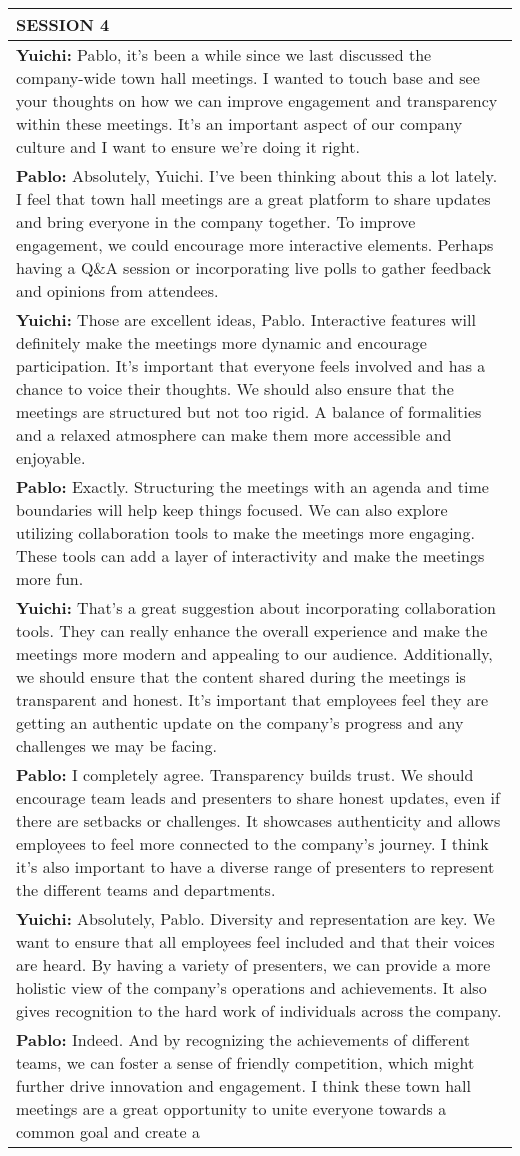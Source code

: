 \begin{xltabular}{0.9\linewidth}{X}
\midrule
\textbf{SESSION 4} \\
\midrule
\textbf{Yuichi:} Pablo, it's been a while since we last discussed the company-wide town hall meetings. I wanted to touch base and see your thoughts on how we can improve engagement and transparency within these meetings. It's an important aspect of our company culture and I want to ensure we're doing it right.\\ \textbf{Pablo:} Absolutely, Yuichi. I've been thinking about this a lot lately. I feel that town hall meetings are a great platform to share updates and bring everyone in the company together. To improve engagement, we could encourage more interactive elements. Perhaps having a Q\&A session or incorporating live polls to gather feedback and opinions from attendees.\\ \textbf{Yuichi:} Those are excellent ideas, Pablo. Interactive features will definitely make the meetings more dynamic and encourage participation. It's important that everyone feels involved and has a chance to voice their thoughts. We should also ensure that the meetings are structured but not too rigid. A balance of formalities and a relaxed atmosphere can make them more accessible and enjoyable.\\ \textbf{Pablo:} Exactly. Structuring the meetings with an agenda and time boundaries will help keep things focused. We can also explore utilizing collaboration tools to make the meetings more engaging.  These tools can add a layer of interactivity and make the meetings more fun.\\ \textbf{Yuichi:} That's a great suggestion about incorporating collaboration tools. They can really enhance the overall experience and make the meetings more modern and appealing to our audience. Additionally, we should ensure that the content shared during the meetings is transparent and honest. It's important that employees feel they are getting an authentic update on the company's progress and any challenges we may be facing.\\ \textbf{Pablo:} I completely agree. Transparency builds trust. We should encourage team leads and presenters to share honest updates, even if there are setbacks or challenges. It showcases authenticity and allows employees to feel more connected to the company's journey. I think it's also important to have a diverse range of presenters to represent the different teams and departments. \\ \textbf{Yuichi:} Absolutely, Pablo. Diversity and representation are key. We want to ensure that all employees feel included and that their voices are heard. By having a variety of presenters, we can provide a more holistic view of the company's operations and achievements. It also gives recognition to the hard work of individuals across the company.\\ \textbf{Pablo:} Indeed. And by recognizing the achievements of different teams, we can foster a sense of friendly competition, which might further drive innovation and engagement. I think these town hall meetings are a great opportunity to unite everyone towards a common goal and create a 
\end{xltabular}
